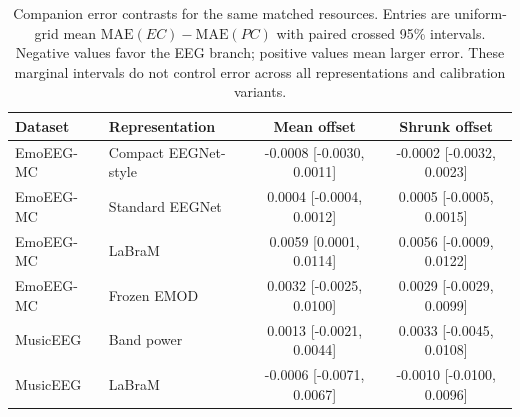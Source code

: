 \begin{table}[t]
\centering\small
\caption{Companion error contrasts for the same matched resources. Entries are uniform-grid mean $\mathrm{MAE}(EC)-\mathrm{MAE}(PC)$ with paired crossed 95\% intervals. Negative values favor the EEG branch; positive values mean larger error. These marginal intervals do not control error across all representations and calibration variants.}
\label{tab:v3-mae}
\begin{tabular}{@{}llcc@{}}
\toprule
Dataset & Representation & Mean offset & Shrunk offset \\
\midrule
EmoEEG-MC & Compact EEGNet-style & -0.0008 [-0.0030, 0.0011] & -0.0002 [-0.0032, 0.0023] \\
EmoEEG-MC & Standard EEGNet & 0.0004 [-0.0004, 0.0012] & 0.0005 [-0.0005, 0.0015] \\
EmoEEG-MC & LaBraM & 0.0059 [0.0001, 0.0114] & 0.0056 [-0.0009, 0.0122] \\
EmoEEG-MC & Frozen EMOD & 0.0032 [-0.0025, 0.0100] & 0.0029 [-0.0029, 0.0099] \\
MusicEEG & Band power & 0.0013 [-0.0021, 0.0044] & 0.0033 [-0.0045, 0.0108] \\
MusicEEG & LaBraM & -0.0006 [-0.0071, 0.0067] & -0.0010 [-0.0100, 0.0096] \\
\bottomrule
\end{tabular}
\end{table}
